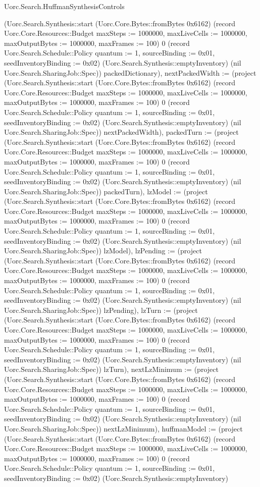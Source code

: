 \begin{lexlean}{Uorc.Search.HuffmanSynthesisControls}
\begin{semanticmodule}
{(Uorc.Search.Synthesis::start (Uorc.Core.Bytes::fromBytes 0x6162) (record Uorc.Core.Resources::Budget {maxSteps := 1000000, maxLiveCells := 1000000, maxOutputBytes := 1000000, maxFrames := 100}) 0 (record Uorc.Search.Schedule::Policy {quantum := 1, sourceBinding := 0x01, seedInventoryBinding := 0x02}) (Uorc.Search.Synthesis::emptyInventory) (nil Uorc.Search.SharingJob::Spec)) packedDictionary), nextPackedWidth := (project (Uorc.Search.Synthesis::start (Uorc.Core.Bytes::fromBytes 0x6162) (record Uorc.Core.Resources::Budget {maxSteps := 1000000, maxLiveCells := 1000000, maxOutputBytes := 1000000, maxFrames := 100}) 0 (record Uorc.Search.Schedule::Policy {quantum := 1, sourceBinding := 0x01, seedInventoryBinding := 0x02}) (Uorc.Search.Synthesis::emptyInventory) (nil Uorc.Search.SharingJob::Spec)) nextPackedWidth), packedTurn := (project (Uorc.Search.Synthesis::start (Uorc.Core.Bytes::fromBytes 0x6162) (record Uorc.Core.Resources::Budget {maxSteps := 1000000, maxLiveCells := 1000000, maxOutputBytes := 1000000, maxFrames := 100}) 0 (record Uorc.Search.Schedule::Policy {quantum := 1, sourceBinding := 0x01, seedInventoryBinding := 0x02}) (Uorc.Search.Synthesis::emptyInventory) (nil Uorc.Search.SharingJob::Spec)) packedTurn), lzModel := (project (Uorc.Search.Synthesis::start (Uorc.Core.Bytes::fromBytes 0x6162) (record Uorc.Core.Resources::Budget {maxSteps := 1000000, maxLiveCells := 1000000, maxOutputBytes := 1000000, maxFrames := 100}) 0 (record Uorc.Search.Schedule::Policy {quantum := 1, sourceBinding := 0x01, seedInventoryBinding := 0x02}) (Uorc.Search.Synthesis::emptyInventory) (nil Uorc.Search.SharingJob::Spec)) lzModel), lzPending := (project (Uorc.Search.Synthesis::start (Uorc.Core.Bytes::fromBytes 0x6162) (record Uorc.Core.Resources::Budget {maxSteps := 1000000, maxLiveCells := 1000000, maxOutputBytes := 1000000, maxFrames := 100}) 0 (record Uorc.Search.Schedule::Policy {quantum := 1, sourceBinding := 0x01, seedInventoryBinding := 0x02}) (Uorc.Search.Synthesis::emptyInventory) (nil Uorc.Search.SharingJob::Spec)) lzPending), lzTurn := (project (Uorc.Search.Synthesis::start (Uorc.Core.Bytes::fromBytes 0x6162) (record Uorc.Core.Resources::Budget {maxSteps := 1000000, maxLiveCells := 1000000, maxOutputBytes := 1000000, maxFrames := 100}) 0 (record Uorc.Search.Schedule::Policy {quantum := 1, sourceBinding := 0x01, seedInventoryBinding := 0x02}) (Uorc.Search.Synthesis::emptyInventory) (nil Uorc.Search.SharingJob::Spec)) lzTurn), nextLzMinimum := (project (Uorc.Search.Synthesis::start (Uorc.Core.Bytes::fromBytes 0x6162) (record Uorc.Core.Resources::Budget {maxSteps := 1000000, maxLiveCells := 1000000, maxOutputBytes := 1000000, maxFrames := 100}) 0 (record Uorc.Search.Schedule::Policy {quantum := 1, sourceBinding := 0x01, seedInventoryBinding := 0x02}) (Uorc.Search.Synthesis::emptyInventory) (nil Uorc.Search.SharingJob::Spec)) nextLzMinimum), huffmanModel := (project (Uorc.Search.Synthesis::start (Uorc.Core.Bytes::fromBytes 0x6162) (record Uorc.Core.Resources::Budget {maxSteps := 1000000, maxLiveCells := 1000000, maxOutputBytes := 1000000, maxFrames := 100}) 0 (record Uorc.Search.Schedule::Policy {quantum := 1, sourceBinding := 0x01, seedInventoryBinding := 0x02}) (Uorc.Search.Synthesis::emptyInventory) }
\end{semanticmodule}
\end{lexlean}
